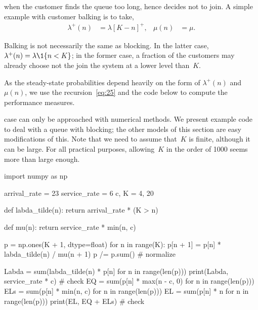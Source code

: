 \documentclass[stochastic-or.tex]{subfiles}
\begin{document}

 when the customer finds the queue too long, hence decides not to join.
A simple example with customer balking is to take,
 \begin{align*}
\lambda^{+}(n) &= \lambda [K-n]^{+}, &  \mu(n)&=\mu.
\end{align*}

Balking is not necessarily the same as blocking.
In the latter case, $\lambda^{+}(n)= \lambda \1{n < K}$; in the former case, a fraction of the customers may already choose not the join the system at a lower level than~$K$.

As the steady-state probabilities depend heavily on the form of $\lambda^{+}(n)$ and $\mu(n)$, we use the recursion~\cref{eq:25} and the code below to compute the performance measures.


 case can only be approached with numerical methods.
We present example code to deal with a queue with blocking; the other models of this section are easy modifications of this.
Note that we need to assume that~$K$ is finite, although it can be large. For all practical purposes, allowing~$K$ in the order of 1000 seems more than large enough.

\begin{python}
import numpy as np

arrival_rate = 23
service_rate = 6
c, K = 4, 20


def labda_tilde(n):
    return arrival_rate * (K > n)


def mu(n):
    return service_rate * min(n, c)


p = np.ones(K + 1, dtype=float)
for n in range(K):
    p[n + 1] = p[n] * labda_tilde(n) / mu(n + 1)
p /= p.sum()  # normalize

Labda = sum(labda_tilde(n) * p[n] for n in range(len(p)))
print(Labda, service_rate * c) # check
EQ = sum(p[n] * max(n - c, 0) for n in range(len(p)))
ELs = sum(p[n] * min(n, c) for n in range(len(p)))
EL = sum(p[n] * n for n in range(len(p)))
print(EL, EQ + ELs) # check
\end{python}
\end{document}
